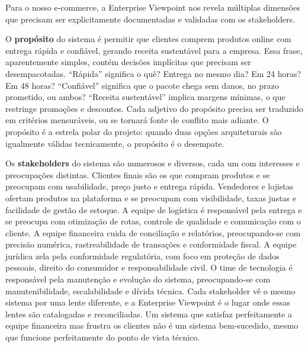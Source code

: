 Para o nosso e-commerce, a Enterprise Viewpoint nos revela múltiplas dimensões
que precisam ser explicitamente documentadas e validadas com os stakeholders.

O \textbf{propósito} do sistema é permitir que clientes comprem produtos online
com entrega rápida e confiável, gerando receita sustentável para a empresa.
Essa frase, aparentemente simples, contém decisões implícitas que precisam ser
desempacotadas. ``Rápida'' significa o quê? Entrega no mesmo dia? Em 24 horas? Em
48 horas? ``Confiável'' significa que o pacote chega sem danos, no prazo prometido,
ou ambos? ``Receita sustentável'' implica margens mínimas, o que restringe
promoções e descontos. Cada adjetivo do propósito precisa ser traduzido em
critérios mensuráveis, ou se tornará fonte de conflito mais adiante. O propósito
é a estrela polar do projeto: quando duas opções arquiteturais são igualmente
válidas tecnicamente, o propósito é o desempate.

Os \textbf{stakeholders} do sistema são numerosos e diversos, cada um com
interesses e preocupações distintas. Clientes finais são os que compram produtos
e se preocupam com usabilidade, preço justo e entrega rápida. Vendedores e
lojistas ofertam produtos na plataforma e se preocupam com visibilidade, taxas
justas e facilidade de gestão de estoque. A equipe de logística é responsável pela
entrega e se preocupa com otimização de rotas, controle de qualidade e comunicação
com o cliente. A equipe financeira cuida de conciliação e relatórios, preocupando-se
com precisão numérica, rastreabilidade de transações e conformidade fiscal. A equipe
jurídica zela pela conformidade regulatória, com foco em proteção de dados pessoais,
direito do consumidor e responsabilidade civil. O time de tecnologia é responsável
pela manutenção e evolução do sistema, preocupando-se com manutenibilidade,
escalabilidade e dívida técnica. Cada stakeholder vê o mesmo sistema por uma lente
diferente, e a Enterprise Viewpoint é o lugar onde essas lentes são catalogadas e
reconciliadas. Um sistema que satisfaz perfeitamente a equipe financeira mas frustra
os clientes não é um sistema bem-sucedido, mesmo que funcione perfeitamente do
ponto de vista técnico.

